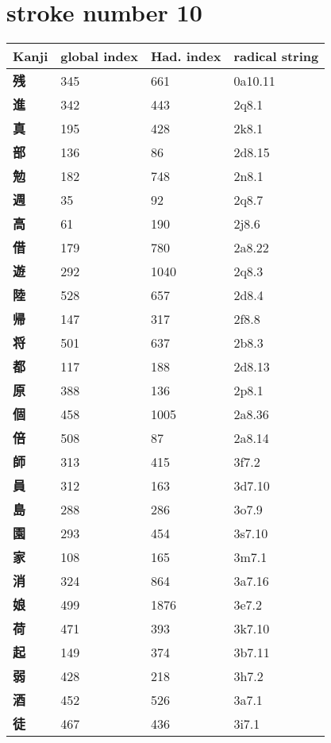 \section{stroke number 10}
  \begin{longtable}[c]{llll}
    \bfseries Kanji & \bfseries global index & \bfseries Had. index & \bfseries radical string\\\hline\endhead
    \bfseries 残 & 345 & 661 & 0a10.11\\
    \bfseries 進 & 342 & 443 & 2q8.1\\
    \bfseries 真 & 195 & 428 & 2k8.1\\
    \bfseries 部 & 136 & 86 & 2d8.15\\
    \bfseries 勉 & 182 & 748 & 2n8.1\\
    \bfseries 週 & 35 & 92 & 2q8.7\\
    \bfseries 高 & 61 & 190 & 2j8.6\\
    \bfseries 借 & 179 & 780 & 2a8.22\\
    \bfseries 遊 & 292 & 1040 & 2q8.3\\
    \bfseries 陸 & 528 & 657 & 2d8.4\\
    \bfseries 帰 & 147 & 317 & 2f8.8\\
    \bfseries 将 & 501 & 637 & 2b8.3\\
    \bfseries 都 & 117 & 188 & 2d8.13\\
    \bfseries 原 & 388 & 136 & 2p8.1\\
    \bfseries 個 & 458 & 1005 & 2a8.36\\
    \bfseries 倍 & 508 & 87 & 2a8.14\\
    \bfseries 師 & 313 & 415 & 3f7.2\\
    \bfseries 員 & 312 & 163 & 3d7.10\\
    \bfseries 島 & 288 & 286 & 3o7.9\\
    \bfseries 園 & 293 & 454 & 3s7.10\\
    \bfseries 家 & 108 & 165 & 3m7.1\\
    \bfseries 消 & 324 & 864 & 3a7.16\\
    \bfseries 娘 & 499 & 1876 & 3e7.2\\
    \bfseries 荷 & 471 & 393 & 3k7.10\\
    \bfseries 起 & 149 & 374 & 3b7.11\\
    \bfseries 弱 & 428 & 218 & 3h7.2\\
    \bfseries 酒 & 452 & 526 & 3a7.1\\
    \bfseries 徒 & 467 & 436 & 3i7.1\\

\end{longtable}
